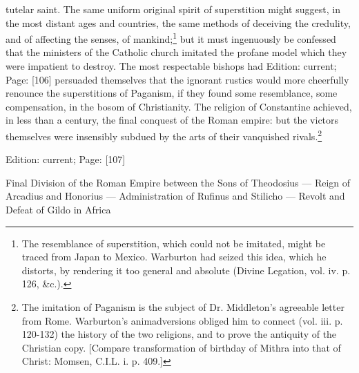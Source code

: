 tutelar saint. The same uniform original spirit of superstition might suggest, in the most distant ages and countries, the same methods of deceiving the credulity, and of affecting the senses, of mankind;\footnote{The resemblance of superstition, which could not be imitated, might be traced from Japan to Mexico. Warburton had seized this idea, which he distorts, by rendering it too general and absolute (Divine Legation, vol. iv. p. 126, \&c.).} but it must ingenuously be confessed that the ministers of the Catholic church imitated the profane model which they were impatient to destroy. The most respectable bishops had Edition: current; Page: [106] persuaded themselves that the ignorant rustics would more cheerfully renounce the superstitions of Paganism, if they found some resemblance, some compensation, in the bosom of Christianity. The religion of Constantine achieved, in less than a century, the final conquest of the Roman empire: but the victors themselves were insensibly subdued by the arts of their vanquished rivals.\footnote{The imitation of Paganism is the subject of Dr. Middleton\texthebrew{}’s agreeable letter from Rome. Warburton\texthebrew{}’s animadversions obliged him to connect (vol. iii. p. 120-132) the history of the two religions, and to prove the antiquity of the Christian copy. [Compare transformation of birthday of Mithra into that of Christ: Momsen, C.I.L. i. p. 409.]}

Edition: current; Page: [107]


Final Division of the Roman Empire between the Sons of Theodosius \texthebrew{—} Reign of Arcadius and Honorius \texthebrew{—} Administration of Rufinus and Stilicho \texthebrew{—} Revolt and Defeat of Gildo in Africa

